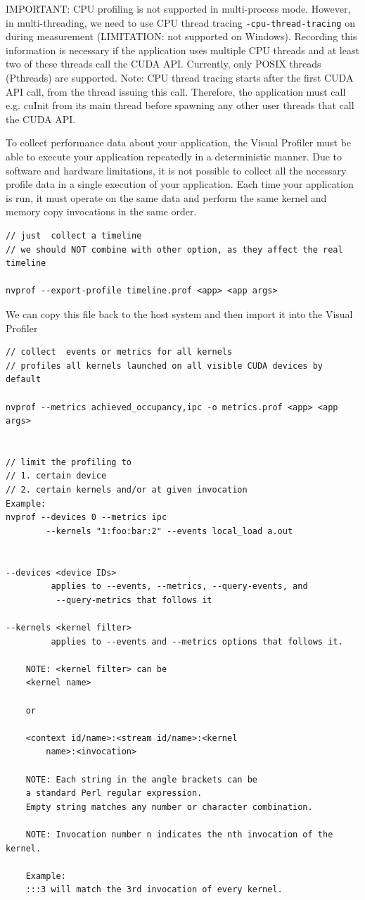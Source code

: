 IMPORTANT:  CPU profiling is not supported in multi-process mode.
However, in multi-threading, we need to use CPU thread tracing
\verb!-cpu-thread-tracing! on during measurement (LIMITATION: not supported on
Windows). Recording this information is necessary if the application uses
multiple CPU threads and at least two of these threads call the CUDA API.
Currently, only POSIX threads (Pthreads) are supported.
Note: CPU thread tracing starts after the first CUDA API call, from the thread
issuing this call.
Therefore, the application must call e.g. cuInit from its main thread before
spawning any other user threads that call the CUDA API.




To collect performance data about your application, the Visual Profiler must be
able to execute your application repeatedly in a deterministic manner. Due to
software and hardware limitations, it is not possible to collect all the
necessary profile data in a single execution of your application.
Each time your application is run, it must operate on the same data and perform
the same kernel and memory copy invocations in the same order.


\begin{verbatim}
// just  collect a timeline
// we should NOT combine with other option, as they affect the real timeline

nvprof --export-profile timeline.prof <app> <app args>
\end{verbatim}

We can copy this file back to the host system and then import it into the Visual
Profiler

\begin{verbatim}
// collect  events or metrics for all kernels
// profiles all kernels launched on all visible CUDA devices by default

nvprof --metrics achieved_occupancy,ipc -o metrics.prof <app> <app args> 


// limit the profiling to
// 1. certain device 
// 2. certain kernels and/or at given invocation 
Example:
nvprof --devices 0 --metrics ipc
        --kernels "1:foo:bar:2" --events local_load a.out
        

--devices <device IDs> 
         applies to --events, --metrics, --query-events, and 
          --query-metrics that follows it

--kernels <kernel filter> 
         applies to --events and --metrics options that follows it.

	NOTE: <kernel filter> can be
	<kernel name>
	
	or
	
	<context id/name>:<stream id/name>:<kernel
        name>:<invocation>
        
    NOTE: Each string in the angle brackets can be 
    a standard Perl regular expression. 
    Empty string matches any number or character combination.

	NOTE: Invocation number n indicates the nth invocation of the kernel.
	
	Example:
	:::3 will match the 3rd invocation of every kernel.
	    
\end{verbatim}
 
